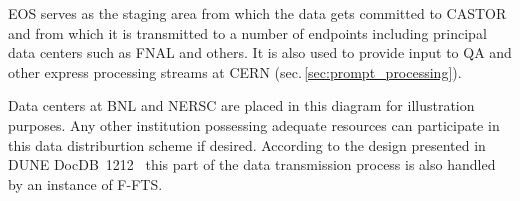 EOS serves as the staging area from which the data gets committed to CASTOR
and from which it is transmitted to a number of endpoints including principal data centers such as FNAL and others.
It is also used to provide input to QA and other express processing streams at CERN (sec.\,\ref{sec:prompt_processing}).

Data centers at BNL and NERSC are placed in this diagram for illustration purposes. Any other institution possessing adequate
resources can participate in this data distriburtion scheme if desired. According to the design presented in DUNE DocDB~1212~\cite{docdb1212}
this part of the data transmission process is also handled by an instance of F-FTS.


